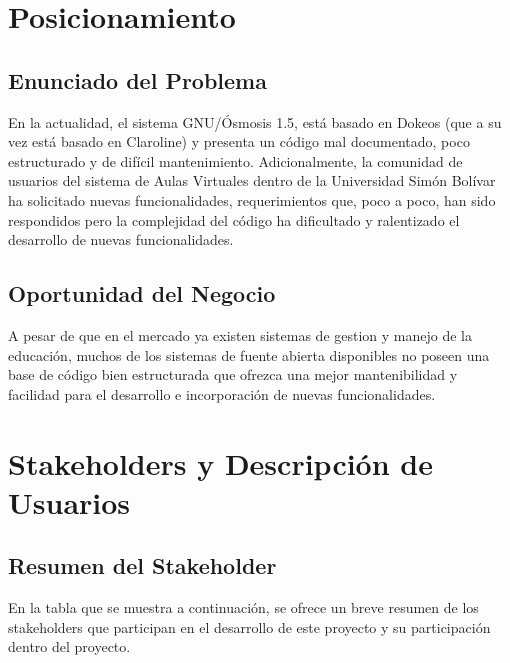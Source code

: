\documentclass{article}
\begin{document}
\section{Posicionamiento}
	
	\subsection{Enunciado del Problema}
	En la actualidad, el sistema GNU/Ósmosis 1.5, está basado en Dokeos (que a su vez está basado en Claroline) y presenta un código mal documentado, poco estructurado y de difícil mantenimiento. Adicionalmente, la comunidad de usuarios del sistema de Aulas Virtuales dentro de la Universidad Simón Bolívar ha solicitado nuevas funcionalidades, requerimientos que, poco a poco, han sido respondidos pero la complejidad del código ha dificultado y ralentizado el desarrollo de nuevas funcionalidades.
	
	\subsection{Oportunidad del Negocio}
	A pesar de que en el mercado ya existen sistemas de gestion y manejo de la educación, muchos de los sistemas de fuente abierta disponibles no poseen una base de código bien estructurada que ofrezca una mejor mantenibilidad y facilidad para el desarrollo e incorporación de nuevas funcionalidades.

\section{Stakeholders y Descripción de Usuarios}
	\subsection{Resumen del Stakeholder}
	En la tabla que se muestra a continuación, se ofrece un breve resumen de los stakeholders que participan en el desarrollo de este proyecto y su participación dentro del proyecto.
\end{document}
